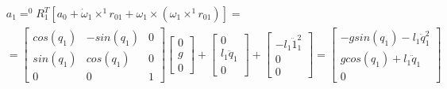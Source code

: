 \documentclass[a4paper,14pt]{extreport}
\begin{document}
\begin{itemize}
	\begin{align*}
	&a_1 = ^0R_1^T [a_0 + \dot \omega_1 \times ^1r_{01} + \omega_1 \times (\omega_1 \times ^1r_{01})]
	=\\
	&=
\begin{bmatrix}
cos(q_1) & -sin(q_1) & 0\\
sin(q_1)& cos(q_1) &0\\
0&0 &1
\end{bmatrix}			
	\begin{bmatrix}
	0\\
	g\\
	0
	\end{bmatrix}			
	+
	\begin{bmatrix}
	0\\
	l_1 \ddot q_1\\
	0
	\end{bmatrix}			
	+
	\begin{bmatrix}
	-l_1 \ddot 1_1^2\\
	0\\
	0		
	\end{bmatrix}			
	=
	\begin{bmatrix}
	-g sin(q_1) - l_1 \ddot q_1^2\\
	g cos(q_1) + l_1 \ddot q_1\\
	0
	\end{bmatrix}
	\end{align*}
	
	


\end{itemize}
\end{document}
